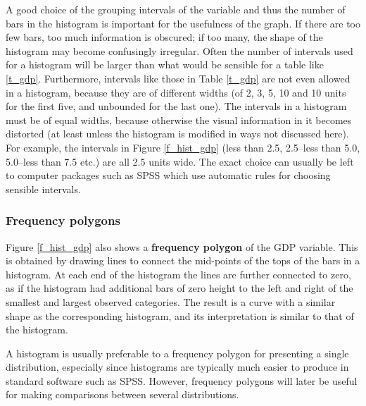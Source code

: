 A good choice of the grouping intervals of the variable and thus the
number of bars in the histogram is important for the usefulness of the
graph. If there are too few bars, too much information is obscured; if
too many, the shape of the histogram may become confusingly irregular.
Often the number of intervals used for a histogram will be larger than
what would be sensible for a table like \ref{t_gdp}. Furthermore,
intervals like those in Table \ref{t_gdp} are not even allowed in a
histogram, because they are of different widths (of 2, 3, 5, 10 and 10
units for the first five, and unbounded for the last one). The intervals
in a histogram must be of equal widths, because otherwise the visual
information in it becomes distorted (at least unless the histogram is
modified in ways not discussed here). For example, the intervals in
Figure \ref{f_hist_gdp} (less than 2.5, 2.5--less than 5.0, 5.0--less
than 7.5 etc.) are all 2.5 units wide. The exact choice
can usually be left to computer packages such as SPSS which use
automatic rules for choosing sensible intervals.

\subsubsection{Frequency polygons}

Figure \ref{f_hist_gdp} also shows a \textbf{frequency polygon} of the
GDP variable. This is obtained by drawing lines to connect the
mid-points of the tops of the bars in a histogram. At each end of the
histogram the lines are further connected to zero, as if the histogram
had additional bars of zero height to the left and right of the smallest
and largest observed categories. The result is a curve with a similar
shape as the corresponding histogram, and its interpretation is similar
to that of the histogram.

A histogram is usually preferable to a frequency polygon for presenting
a single distribution, especially since histograms are typically much
easier to produce in standard software such as SPSS. However, frequency
polygons will later be useful for making comparisons between several
distributions.

